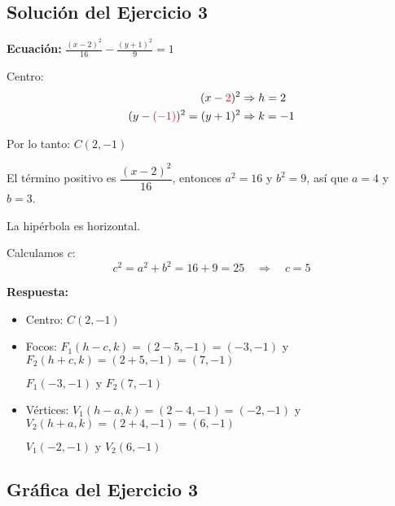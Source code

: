 \documentclass[12pt,a4paper]{article}
\begin{document}
	\subsection*{Solución del Ejercicio 3}

	\textbf{Ecuación:} $\displaystyle\frac{(x-2)^2}{16}-\frac{(y+1)^2}{9}=1$

	\bigskip

	Centro:
	\[
	\begin{aligned}
		(x-{\color{red}{2}})^2&\Rightarrow h=2\\
		(y-{\color{red}{(-1)}})^2=(y+1)^2&\Rightarrow k=-1
	\end{aligned}
	\]

	Por lo tanto: $\boxed{C(2,-1)}$

	\bigskip

	El término positivo es $\dfrac{(x-2)^2}{16}$, entonces $a^2=16$ y $b^2=9$, así que $a=4$ y $b=3$.

	\bigskip

	La hipérbola es horizontal.

	\bigskip

	Calculamos $c$:
	\[
	c^2=a^2+b^2=16+9=25 \quad\Rightarrow\quad c=5
	\]

	\textbf{Respuesta:}
	\begin{itemize}
		\item Centro: $\boxed{C(2,-1)}$
		\item Focos: $F_1(h-c,k)=(2-5,-1)=(-3,-1)$ y $F_2(h+c,k)=(2+5,-1)=(7,-1)$

		$\boxed{F_1(-3,-1)\text{ y }F_2(7,-1)}$

		\item Vértices: $V_1(h-a,k)=(2-4,-1)=(-2,-1)$ y $V_2(h+a,k)=(2+4,-1)=(6,-1)$

		$\boxed{V_1(-2,-1)\text{ y }V_2(6,-1)}$
	\end{itemize}

	\subsection*{Gráfica del Ejercicio 3}
\end{document}
